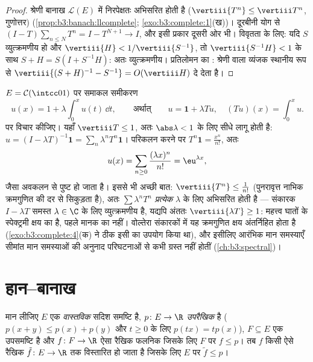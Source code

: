 \begin{proof}
श्रेणी बानाख $\mathcal L(E)$ में निरपेक्षतः अभिसरित होती है ($\vertiii{T^n} \leq \vertiii
T^n$,
गुणोत्तर) (\cref{prop:b3:banach:llcomplete}; \cref{exo:b3:complete:1}(ख))। दूरबीनी योग से $(I - T)\sum_{n \leq
N}T^n = I - T^{N+1} \to I$, और इसी प्रकार
दूसरी ओर भी। विवृतता के लिए: यदि $S$ व्युत्क्रमणीय हो और $\vertiii{H} <
1/\vertiii{S^{-1}}$,
तो $\vertiii{S^{-1}H} < 1$ के साथ $S + H = S(I + S^{-1}H)$: अतः व्युत्क्रमणीय। प्रतिलोमन का :
श्रेणी वाला व्यंजक स्थानीय रूप से $\vertiii{(S+H)^{-1} - S^{-1}} =
O(\vertiii H)$ दे देता है।
\end{proof}

\begin{example}[न्यूमन से हल किया गया एक वोल्तेरा समीकरण]
\label{ex:b3:banach:volterraexample}
$E = \mathcal C(\intcc01)$ पर समाकल समीकरण
\[
u(x) = 1 + \lambda\int_0^xu(t)\,\dd t,
\qquad\text{अर्थात्}\qquad u = \mathbf 1 + \lambda Tu,
\quad (Tu)(x) = \int_0^xu .
\]
पर विचार कीजिए। यहाँ $\vertiii T \leq 1$, अतः $\abs\lambda < 1$ के लिए  सीधे
लागू होती है: $u = (I - \lambda T)^{-1}\mathbf 1 =
\sum_n\lambda^nT^n\mathbf 1$। परिकलन करने पर $T^n\mathbf 1 =
\frac{x^n}{n!}$, अतः
\[
u(x) = \sum_{n\geq0}\frac{(\lambda x)^n}{n!} =
\eu^{\lambda x} ,
\]
जैसा अवकलन से पुष्ट हो जाता है। इससे भी अच्छी बात: $\vertiii{T^n} \leq
\frac1{n!}$
(पुनरावृत्त नाभिक क्रमगुणित की दर से सिकुड़ता है), अतः $\sum\lambda^nT^n$
\emph{प्रत्येक} $\lambda$ के लिए अभिसरित होती है --- संकारक $I - \lambda T$
समस्त $\lambda
\in \C$ के लिए व्युत्क्रमणीय है, यद्यपि अंततः $\vertiii{\lambda T} \geq 1$: महत्त्व
घातों के स्पेक्ट्रमी क्षय का है, पहले मानक का नहीं। वोल्तेरा
संकारकों में यह क्रमगुणित क्षय अंतर्निहित होता है (\cref{exo:b3:complete:4}(क) ने ठीक
इसी का उपयोग किया था), और इसीलिए आरंभिक मान समस्याएँ सीमांत मान
समस्याओं की अनुनाद परिघटनाओं से कभी ग्रस्त नहीं होतीं (\cref{ch:b3:spectral})।
\end{example}

\section{हान--बानाख}

\begin{theorem}[हान--बानाख, वैश्लेषिक रूप]
\label{thm:b3:banach:hahnbanach}
मान लीजिए $E$ एक \emph{वास्तविक} सदिश समष्टि है, $p \colon E \to \R$
\emph{उपरैखिक} है ($p(x + y) \leq p(x) + p(y)$ और $t \geq 0$ के लिए $p(tx) =
tp(x)$), $F \subseteq E$ एक उपसमष्टि
है और $f
\colon F \to \R$ ऐसा रैखिक फलनिक जिसके लिए $F$ पर $f \leq p$। तब $f$ किसी
ऐसे रैखिक $\tilde f \colon E \to \R$ तक विस्तारित हो जाता है जिसके लिए $E$ पर
$\tilde f \leq p$।
\end{theorem}

